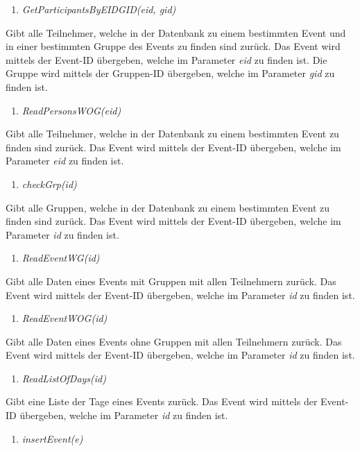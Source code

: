\documentclass[12pt,parskip=full, pagea4]{scrreprt}
\begin{document}
			\begin{enumerate}[resume]
				\item \textit{GetParticipantsByEIDGID(eid, gid)}
			\end{enumerate}
			\leftskip=1.5cm	Gibt alle Teilnehmer, welche in der Datenbank zu einem bestimmten Event und in einer bestimmten Gruppe des Events zu finden sind zur\"uck. Das Event wird mittels der Event-ID \"ubergeben, welche im Parameter \textit{eid} zu finden ist. Die Gruppe wird mittels der Gruppen-ID \"ubergeben, welche im Parameter \textit{gid} zu finden ist.
			\begin{enumerate}[resume]
				\item \textit{ReadPersonsWOG(eid)}
			\end{enumerate}
			\leftskip=1.5cm	Gibt alle Teilnehmer, welche in der Datenbank zu einem bestimmten Event zu finden sind zur\"uck. Das Event wird mittels der Event-ID \"ubergeben, welche im Parameter \textit{eid} zu finden ist. 
			\begin{enumerate}[resume]
				\item \textit{checkGrp(id)}
			\end{enumerate}
			\leftskip=1.5cm	Gibt alle Gruppen, welche in der Datenbank zu einem bestimmten Event zu finden sind zur\"uck. Das Event wird mittels der Event-ID \"ubergeben, welche im Parameter \textit{id} zu finden ist.
			\begin{enumerate}[resume]
				\item \textit{ReadEventWG(id)}
			\end{enumerate}
			\leftskip=1.5cm	Gibt alle Daten eines Events mit Gruppen mit allen Teilnehmern zur\"uck. Das Event wird mittels der Event-ID \"ubergeben, welche im Parameter \textit{id} zu finden ist. 
			\begin{enumerate}[resume]
				\item \textit{ReadEventWOG(id)}
			\end{enumerate}
			\leftskip=1.5cm	Gibt alle Daten eines Events ohne Gruppen mit allen Teilnehmern zur\"uck. Das Event wird mittels der Event-ID \"ubergeben, welche im Parameter \textit{id} zu finden ist. 
			\begin{enumerate}[resume]
				\item \textit{ReadListOfDays(id)}
			\end{enumerate}
			\leftskip=1.5cm	Gibt eine Liste der Tage eines Events zur\"uck. Das Event wird mittels der Event-ID \"ubergeben, welche im Parameter \textit{id} zu finden ist. 
			\begin{enumerate}[resume]
				\item \textit{insertEvent(e)}
			\end{enumerate}
\end{document}
